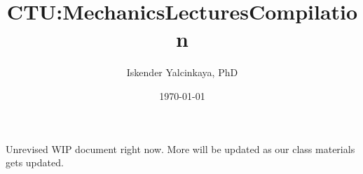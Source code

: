 \documentclass[a4paper,12pt]{book}
\title{CTU:\@ Mechanics\@ Lectures\@ Compilation}
\author{Iskender Yalcinkaya, PhD}
\date{\today}
\begin{document}
\maketitle
\frontmatter
Unrevised WIP document right now. More will be updated as our class materials gets updated.
\tableofcontents
\mainmatter














\backmatter
\end{document}
